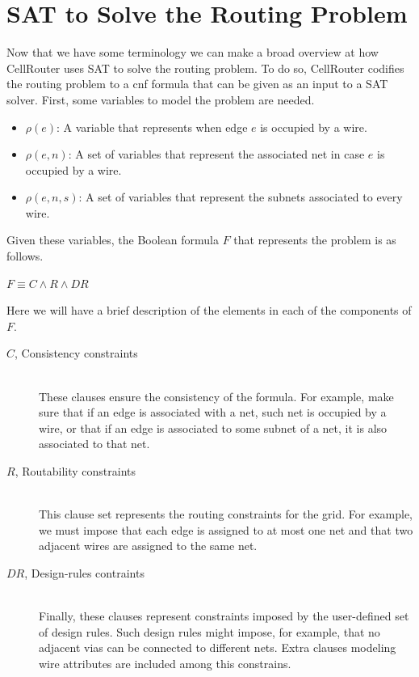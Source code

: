 \section{SAT to Solve the Routing Problem}
\label{sec:satproblems}

Now that we have some terminology we can make a broad overview at how CellRouter uses SAT to solve the routing problem. To do so, CellRouter codifies the routing problem to a \gls{cnf} formula that can be given as an input to a SAT solver. First, some variables to model the problem are needed.

\begin{itemize}
	\item $\rho(e)$: A variable that represents when edge $e$ is occupied by a wire.
	\item $\rho(e, n)$: A set of variables that represent the associated net in case $e$ is occupied by a wire.
	\item $\rho(e, n, s)$: A set of variables that represent the subnets associated to every wire.
\end{itemize}

Given these variables, the Boolean formula $F$ that represents the problem is as follows.

\begin{center}
$F \equiv C \wedge R \wedge DR$
\end{center}

Here we will have a brief description of the elements in each of the components of $F$.

\begin{description}
  \item[$C$, Consistency constraints] \hfill \\
	These clauses ensure the consistency of the formula. For example, make sure that if an edge is associated with a net, such net is occupied by a wire, or that if an edge is associated to some subnet of a net, it is also associated to that net. 
  
  \item[$R$, Routability constraints] \hfill \\
  	This clause set represents the routing constraints for the grid. For example, we must impose that each edge is assigned to at most one net and that two adjacent wires are assigned to the same net. 
  	
  \item[$DR$, Design-rules contraints] \hfill \\
	Finally, these clauses represent constraints imposed by the user-defined set of design rules. Such design rules might impose, for example, that no adjacent vias can be connected to different nets. Extra clauses modeling wire attributes are included among this constrains.  
	
\end{description}

